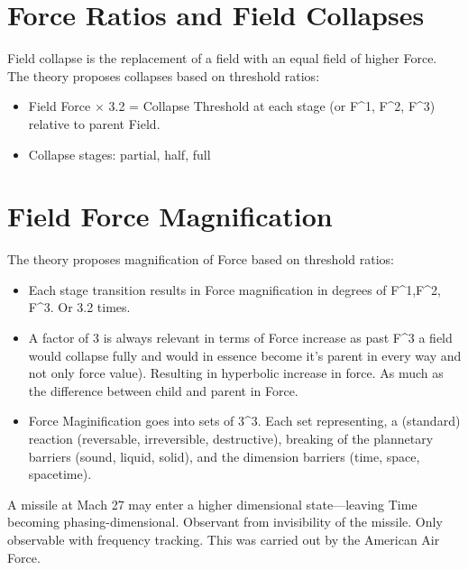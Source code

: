 \documentclass[12pt]{thesis}
\begin{document}
\section{Force Ratios and Field Collapses}
Field collapse is the replacement of a field with an equal field of higher Force.
The theory proposes collapses based on threshold ratios:
\begin{itemize}
    \item Field Force $\times$ 3.2 = Collapse Threshold at each stage (or F^1, F^2, F^3) relative to parent Field.
    \item Collapse stages: partial, half, full
\end{itemize}

\section{Field Force Magnification}
The theory proposes magnification of Force based on threshold ratios:
\begin{itemize}
    \item Each stage transition results in Force magnification in degrees of F^1,F^2, F^3. Or 3.2 times.
    \item A factor of 3 is always relevant in terms of Force increase as past F^3 a field would collapse fully and would in essence become it's parent in every way and not only force value). Resulting in hyperbolic increase in force. As much as the difference between child and parent in Force. 
    \item Force Maginification goes into sets of 3^3. Each set representing, a (standard) reaction (reversable, irreversible, destructive), breaking of the plannetary barriers (sound, liquid, solid), and the dimension barriers (time, space, spacetime).
\end{itemize}

A missile at Mach 27 may enter a higher dimensional state—leaving Time becoming phasing-dimensional.
Observant from invisibility of the missile. Only observable with frequency tracking. This was carried out by the American Air Force.
\end{document}
